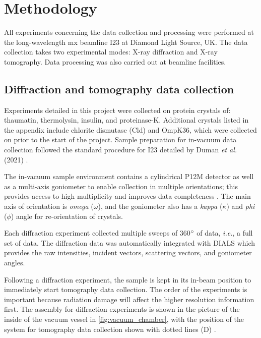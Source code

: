 \newpage
\section{Methodology}\label{sec:methodology}

All experiments concerning the data collection and processing were performed at the long-wavelength \ac{mx} beamline I23 at Diamond Light Source, UK. The data collection takes two experimental modes: X-ray diffraction and X-ray tomography. Data processing was also carried out at beamline facilities. %

\subsection{Diffraction and tomography data collection}

Experiments detailed in this project were collected on protein crystals of: thaumatin, thermolysin, insulin, and proteinase-K. Additional crystals listed in the appendix include chlorite dismutase (Cld) and OmpK36, which were collected on prior to the start of the project.
Sample preparation for in-vacuum data collection followed the standard procedure for I23 detailed by Duman \textit{et al.} (2021) \cite{Duman2021}.

The in-vacuum sample environment contains a cylindrical P12M detector as well as a multi-axis goniometer to enable collection  in multiple orientations; this provides access to high multiplicity and improves data completeness \cite{Finke2016}. The main axis of orientation is \textit{omega} ($\omega$), and the goniometer also has a \textit{kappa} ($\kappa$) and \textit{phi} ($\phi$) angle for re-orientation of crystals. %

Each diffraction experiment collected multiple sweeps of 360$\degree$ of data, \textit{i.e.}, a full set of data. The diffraction data was automatically integrated with DIALS \cite{Winter2018} which provides the raw intensities, incident vectors, scattering vectors, and goniometer angles.

Following a diffraction experiment, the sample is kept in its in-beam position to immediately start tomography data collection. The order of the experiments is important because radiation damage will affect the higher resolution information first. The assembly for diffraction experiments is shown in the picture of the inside of the vacuum vessel in \cref{fig:vacuum_chamber}, with the position of the system for tomography data collection
shown with dotted lines (D) \cite{Kazantsev2021}.%

